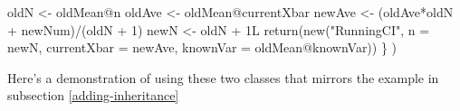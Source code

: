 \documentclass[
  12pt,
  krantz2]{krantz}
\makeatletter
\newenvironment{Shaded}{\begin{snugshade}}{\end{snugshade}}
\newcommand{\AttributeTok}[1]{\textcolor[rgb]{0.61,0.61,0.61}{#1}}
\newcommand{\DecValTok}[1]{\textcolor[rgb]{0.06,0.06,0.06}{#1}}
\newcommand{\FunctionTok}[1]{\textcolor[rgb]{0,0,0}{#1}}
\newcommand{\NormalTok}[1]{#1}
\newcommand{\OtherTok}[1]{\textcolor[rgb]{0.37,0.37,0.37}{#1}}
\newcommand{\SpecialCharTok}[1]{\textcolor[rgb]{0,0,0}{#1}}
\newcommand{\StringTok}[1]{\textcolor[rgb]{0.5,0.5,0.5}{#1}}
\newenvironment{kframe}{%
\medskip{}
\setlength{\fboxsep}{.8em}
 \def\at@end@of@kframe{}%
 \ifinner\ifhmode%
  \def\at@end@of@kframe{\end{minipage}}%
  \begin{minipage}{\columnwidth}%
 \fi\fi%
 \def\FrameCommand##1{\hskip\@totalleftmargin \hskip-\fboxsep
 \colorbox{shadecolor}{##1}\hskip-\fboxsep
     \hskip-\linewidth \hskip-\@totalleftmargin \hskip\columnwidth}%
 \MakeFramed {\advance\hsize-\width
   \@totalleftmargin\z@ \linewidth\hsize
   \@setminipage}}%
 {\par\unskip\endMakeFramed%
 \at@end@of@kframe}
\renewenvironment{Shaded}{\begin{kframe}}{\end{kframe}}
\makeatother
\begin{document}
\begin{Shaded}
\begin{Highlighting}[]
\NormalTok{            oldN }\OtherTok{\textless{}{-}}\NormalTok{ oldMean}\SpecialCharTok{@}\NormalTok{n}
\NormalTok{            oldAve }\OtherTok{\textless{}{-}}\NormalTok{ oldMean}\SpecialCharTok{@}\NormalTok{currentXbar}
\NormalTok{            newAve }\OtherTok{\textless{}{-}}\NormalTok{ (oldAve}\SpecialCharTok{*}\NormalTok{oldN }\SpecialCharTok{+}\NormalTok{ newNum)}\SpecialCharTok{/}\NormalTok{(oldN }\SpecialCharTok{+} \DecValTok{1}\NormalTok{)}
\NormalTok{            newN }\OtherTok{\textless{}{-}}\NormalTok{ oldN }\SpecialCharTok{+}\NormalTok{ 1L}
            \FunctionTok{return}\NormalTok{(}\FunctionTok{new}\NormalTok{(}\StringTok{"RunningCI"}\NormalTok{, }\AttributeTok{n =}\NormalTok{ newN, }\AttributeTok{currentXbar =}\NormalTok{ newAve, }\AttributeTok{knownVar =}\NormalTok{ oldMean}\SpecialCharTok{@}\NormalTok{knownVar))}
\NormalTok{          \}}
\NormalTok{)}
\end{Highlighting}
\end{Shaded}

Here's a demonstration of using these two classes that mirrors the example in subsection \ref{adding-inheritance}
\end{document}
